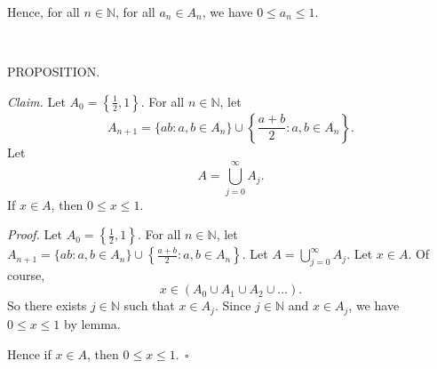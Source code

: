 \documentclass[9pt]{article}
\begin{document}
\noindent Hence, for all $n\in\mathbb{N}$, for all $a_n\in A_n$, we have $0\leq a_n\leq 1$.\newline

~\newline

\noindent\small{PROPOSITION.}\newline

\noindent\textit{Claim. }Let $A_0=\left\{\frac{1}{2},1
\right\}$. For all $n\in\mathbb{N}$, let
\[A_{n+1}=\{ab:a,b\in A_n\}\cup\left\{\frac{a+b}{2}:a,b\in A_n\right\}.\]
Let
\[A=\bigcup_{j=0}^{\infty}{A_j}.\]
If $x\in A$, then $0\leq x\leq 1$.\newline

\noindent\textit{Proof. }Let $A_0=\left\{\frac{1}{2},1
\right\}$. For all $n\in\mathbb{N}$, let $A_{n+1}=\{ab:a,b\in A_n\}\cup\left\{\frac{a+b}{2}:a,b\in A_n\right\}$. Let $A=\bigcup_{j=0}^{\infty}{A_j}$. Let $x\in A$. Of course,
\[x\in(A_0\cup A_1\cup A_2\cup\dots).\]
So there exists $j\in\mathbb{N}$ such that $x\in A_j$. Since $j\in\mathbb{N}$ and $x\in A_j$, we have $0\leq x\leq 1$ by lemma.\newline

\noindent Hence if $x\in A$, then $0\leq x\leq 1.~~\square$
\end{document}
